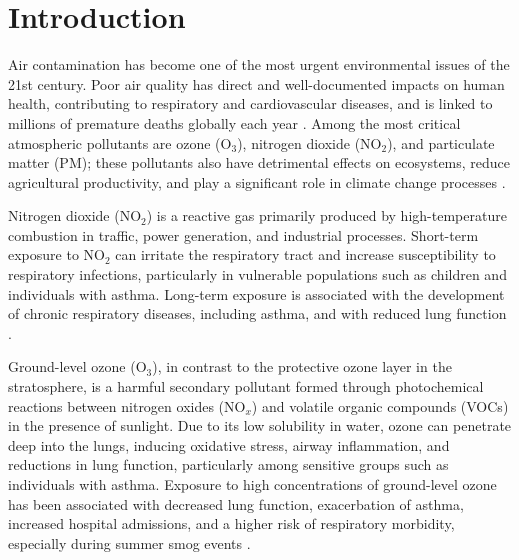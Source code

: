 \chapter[Introduction]{Introduction}
\label{chap:intro}





Air contamination has become one of the most urgent environmental issues of the 21st century. Poor air quality has direct and well-documented impacts on human health, contributing to respiratory and cardiovascular diseases, and is linked to millions of premature deaths globally each year \cite{world2021global, nishida2022impact, rajagopalan2021pollution}. Among the most critical atmospheric pollutants are ozone (O$_3$), nitrogen dioxide (NO$_2$), and particulate matter (PM); these pollutants also have detrimental effects on ecosystems, reduce agricultural productivity, and play a significant role in climate change processes \cite{watson2016impact, fuzzi2015particulate, whoAmbientoutdoor}.

Nitrogen dioxide (NO$_2$) is a reactive gas primarily produced by high-temperature combustion in traffic, power generation, and industrial processes. Short-term exposure to NO$_2$ can irritate the respiratory tract and increase susceptibility to respiratory infections, particularly in vulnerable populations such as children and individuals with asthma. Long-term exposure is associated with the development of chronic respiratory diseases, including asthma, and with reduced lung function \cite{whoTypesPollutants, cao2025short, liu2021long}.

Ground-level ozone (O$_3$), in contrast to the protective ozone layer in the stratosphere, is a harmful secondary pollutant formed through photochemical reactions between nitrogen oxides (NO$_x$) and volatile organic compounds (VOCs) in the presence of sunlight. Due to its low solubility in water, ozone can penetrate deep into the lungs, inducing oxidative stress, airway inflammation, and reductions in lung function, particularly among sensitive groups such as individuals with asthma. Exposure to high concentrations of ground-level ozone has been associated with decreased lung function, exacerbation of asthma, increased hospital admissions, and a higher risk of respiratory morbidity, especially during summer smog events \cite{whoTypesPollutants, zheng2021short, tiotiu2020impact}.


